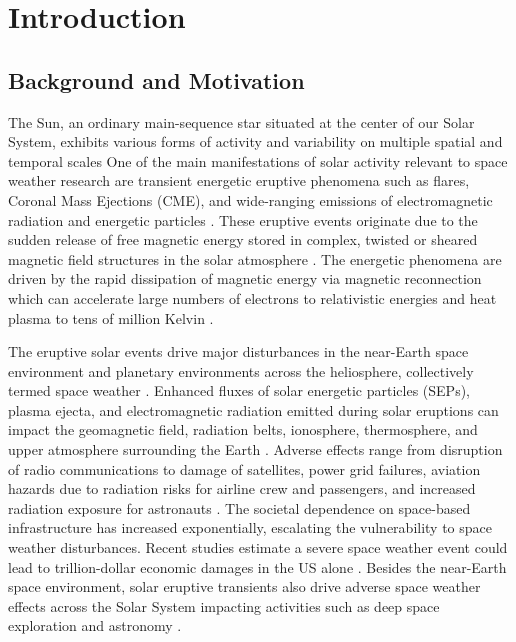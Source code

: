 \chapter{Introduction}
\label{chapter1}

\section{Background and Motivation}
The Sun, an ordinary main-sequence star situated at the center of our Solar System, exhibits various forms of activity and variability on multiple spatial and temporal scales One of the main manifestations of solar activity relevant to space weather research are transient energetic eruptive phenomena such as flares, Coronal Mass Ejections (CME), and wide-ranging emissions of electromagnetic radiation and energetic particles \citep{schwenn_2006, pulkkinen_2007}. These eruptive events originate due to the sudden release of free magnetic energy stored in complex, twisted or sheared magnetic field structures in the solar atmosphere \citep{moore_2001, priest_forbes_2007, zhang_2012, amari_2014}. The energetic phenomena are driven by the rapid dissipation of magnetic energy via magnetic reconnection which can accelerate large numbers of electrons to relativistic energies and heat plasma to tens of million Kelvin \citep{shibata_2011, benz_2017}.

The eruptive solar events drive major disturbances in the near-Earth space environment and planetary environments across the heliosphere, collectively termed space weather \citep{schrijver_2010, eastwood_2017}. Enhanced fluxes of solar energetic particles (SEPs), plasma ejecta, and electromagnetic radiation emitted during solar eruptions can impact the geomagnetic field, radiation belts, ionosphere, thermosphere, and upper atmosphere surrounding the Earth \citep{schwenn_2006, pulkkinen_2007}. Adverse effects range from disruption of radio communications to damage of satellites, power grid failures, aviation hazards due to radiation risks for airline crew and passengers, and increased radiation exposure for astronauts \citep{lanzerotti_2001}. The societal dependence on space-based infrastructure has increased exponentially, escalating the vulnerability to space weather disturbances. Recent studies estimate a severe space weather event could lead to trillion-dollar economic damages in the US alone \citep{oughton_2017}. Besides the near-Earth space environment, solar eruptive transients also drive adverse space weather effects across the Solar System impacting activities such as deep space exploration and astronomy \citep{lilensten_2014}.

